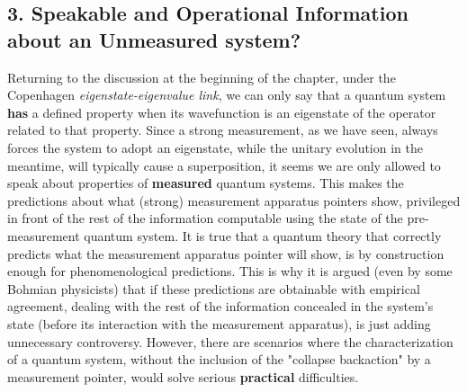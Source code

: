 \documentclass[11pt, a4paper]{article} %
\begin{document}
\subsection*{3. Speakable and Operational Information about an Unmeasured system?}
\vspace{-0.18cm}
Returning to the discussion at the beginning of the chapter, under the Copenhagen {\em eigenstate-eigenvalue link}, we can only say that a quantum system {\bf has} a defined property when its wavefunction is an eigenstate of the operator related to that property. Since a strong measurement, as we have seen, always forces the system to adopt an eigenstate, while the unitary evolution in the meantime, will typically cause a superposition, it seems we are only allowed to speak about properties of {\bf measured} quantum systems. This makes the predictions about what (strong) measurement apparatus pointers show, privileged in front of the rest of the information computable using the state of the pre-measurement quantum system. It is true that a quantum theory that correctly predicts what the measurement apparatus pointer will show, is by construction enough for phenomenological predictions. This is why it is argued (even by some Bohmian physicists) that if these predictions are obtainable with empirical agreement, dealing with the rest of the information concealed in the system's state (before its interaction with the measurement apparatus), is just adding unnecessary controversy. However, there are scenarios where the characterization of a quantum system, without the inclusion of the "collapse backaction" by a measurement pointer, would solve serious {\bf practical} difficulties.\vspace{-0.1cm}
\end{document}
